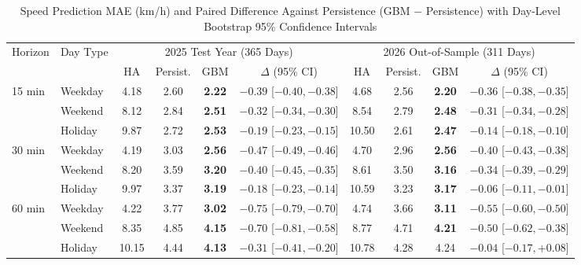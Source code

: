 \begin{table}[t]
\caption{Speed Prediction MAE (km/h) and Paired Difference Against Persistence (GBM $-$ Persistence) with Day-Level Bootstrap 95\% Confidence Intervals}
\label{tab:mae}
\centering
\begin{tabular}{llcccccccc}
\toprule
\multirow{2}{*}{Horizon} & \multirow{2}{*}{Day Type} & \multicolumn{4}{c}{2025 Test Year (365 Days)} & \multicolumn{4}{c}{2026 Out-of-Sample (311 Days)} \\
\cmidrule(lr){3-6} \cmidrule(lr){7-10}
 & & HA & Persist. & GBM & $\Delta$ (95\% CI) & HA & Persist. & GBM & $\Delta$ (95\% CI) \\
\midrule
\multirow{3}{*}{15 min}
 & Weekday     & 4.18 & 2.60 & \textbf{2.22} & $-0.39$ [$-0.40, -0.38$] & 4.68 & 2.56 & \textbf{2.20} & $-0.36$ [$-0.38, -0.35$] \\
 & Weekend     & 8.12 & 2.84 & \textbf{2.51} & $-0.32$ [$-0.34, -0.30$] & 8.54 & 2.79 & \textbf{2.48} & $-0.31$ [$-0.34, -0.28$] \\
 & Holiday     & 9.87 & 2.72 & \textbf{2.53} & $-0.19$ [$-0.23, -0.15$] & 10.50 & 2.61 & \textbf{2.47} & $-0.14$ [$-0.18, -0.10$] \\
\midrule
\multirow{3}{*}{30 min}
 & Weekday     & 4.19 & 3.03 & \textbf{2.56} & $-0.47$ [$-0.49, -0.46$] & 4.70 & 2.96 & \textbf{2.56} & $-0.40$ [$-0.43, -0.38$] \\
 & Weekend     & 8.20 & 3.59 & \textbf{3.20} & $-0.40$ [$-0.45, -0.35$] & 8.61 & 3.50 & \textbf{3.16} & $-0.34$ [$-0.39, -0.29$] \\
 & Holiday     & 9.97 & 3.37 & \textbf{3.19} & $-0.18$ [$-0.23, -0.14$] & 10.59 & 3.23 & \textbf{3.17} & $-0.06$ [$-0.11, -0.01$] \\
\midrule
\multirow{3}{*}{60 min}
 & Weekday     & 4.22 & 3.77 & \textbf{3.02} & $-0.75$ [$-0.79, -0.70$] & 4.74 & 3.66 & \textbf{3.11} & $-0.55$ [$-0.60, -0.50$] \\
 & Weekend     & 8.35 & 4.85 & \textbf{4.15} & $-0.70$ [$-0.81, -0.58$] & 8.77 & 4.71 & \textbf{4.21} & $-0.50$ [$-0.62, -0.38$] \\
 & Holiday     & 10.15 & 4.44 & \textbf{4.13} & $-0.31$ [$-0.41, -0.20$] & 10.78 & 4.28 & 4.24 & $-0.04$ [$-0.17, +0.08$] \\
\bottomrule
\end{tabular}
\end{table}

